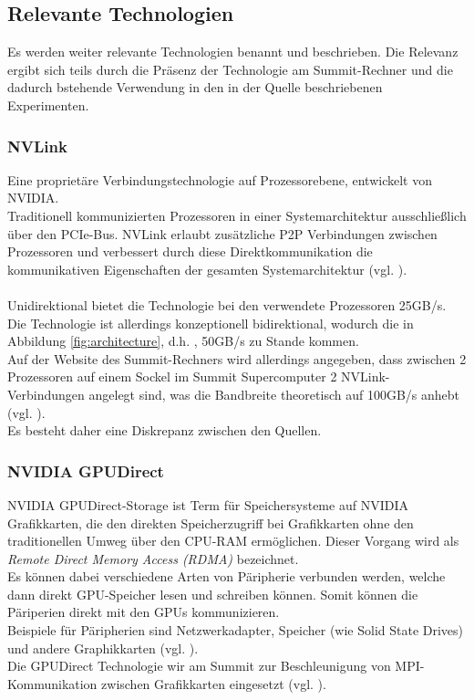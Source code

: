 \subsection{Relevante Technologien}
Es werden weiter relevante Technologien benannt und beschrieben. Die Relevanz ergibt sich teils durch die Präsenz der Technologie am Summit-Rechner und die dadurch bstehende Verwendung in den in der Quelle \cite{mainpaper} beschriebenen Experimenten.

\subsubsection{ NVLink }
Eine proprietäre Verbindungstechnologie auf Prozessorebene, entwickelt von NVIDIA.\\
Traditionell kommunizierten Prozessoren in einer Systemarchitektur ausschließlich über den PCIe-Bus. NVLink erlaubt zusätzliche P2P Verbindungen zwischen Prozessoren und verbessert durch diese Direktkommunikation die kommunikativen Eigenschaften der gesamten Systemarchitektur (vgl. \cite{nvlink}).\\
\\
Unidirektional bietet die Technologie bei den verwendete Prozessoren 25GB/s. Die Technologie ist allerdings konzeptionell bidirektional, wodurch die in Abbildung \ref{fig:architecture}, d.h. \cite[Abb. 1]{mainpaper}, 50GB/s zu Stande kommen.\\
Auf der Website des Summit-Rechners wird allerdings angegeben, dass zwischen 2 Prozessoren auf einem Sockel im Summit Supercomputer 2 NVLink-Verbindungen angelegt sind, was die Bandbreite theoretisch auf 100GB/s anhebt (vgl. \cite[FAQ, What is NVLink?]{osummit}).\\
Es besteht daher eine Diskrepanz zwischen den Quellen.

\subsubsection{ NVIDIA GPUDirect }
NVIDIA GPUDirect-Storage ist Term für Speichersysteme auf NVIDIA Grafikkarten, die den direkten Speicherzugriff bei Grafikkarten ohne den traditionellen Umweg über den CPU-RAM ermöglichen. Dieser Vorgang wird als \textit{Remote Direct Memory Access (RDMA)} bezeichnet.\\
Es können dabei verschiedene Arten von Päripherie verbunden werden, welche dann direkt GPU-Speicher lesen und schreiben können. Somit können die Päriperien direkt mit den GPUs kommunizieren.\\
Beispiele für Päripherien sind Netzwerkadapter, Speicher (wie Solid State Drives) und andere Graphikkarten (vgl. \cite{gpud}).\\
Die GPUDirect Technologie wir am Summit zur Beschleunigung von MPI-Kommunikation zwischen Grafikkarten eingesetzt (vgl. \cite[Kap. 1]{mainpaper}).

